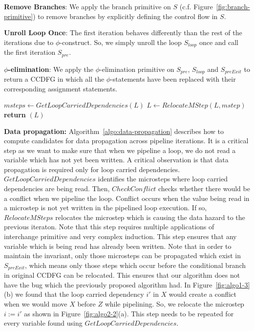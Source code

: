 {\bf Remove Branches}: We apply the branch primitive on $S$ (c.f. Figure~\ref{fig:branch-primitive}) to remove branches by explicitly defining the control flow in $S$. 

{\bf Unroll Loop Once}: The first iteration behaves differently than the rest of the
iterations due to $\phi$-construct. So, we simply unroll the loop $S_{loop}$ once and call the first iteration $S_{pre}$. 

{\bf $\phi$-elimination}: We apply the $\phi$-elimination primitive on $S_{pre}$, $S_{loop}$ and $S_{preExit}$ to return a CCDFG in which all the $\phi$-statements have been replaced with their corresponding assignment statements. 

\begin{algorithm}
\caption{Data propagation} 
\label{algo:data-propagation}
\begin{algorithmic}[1]
\State $msteps \leftarrow GetLoopCarriedDependencies(L)$
\State $L \leftarrow RelocateMStep (L, mstep)$
\EndIf
\EndFor
\State \textbf{return} $(L)$
\EndProcedure
\end{algorithmic}
\end{algorithm}

{\bf Data propagation:} Algorithm~\ref{algo:data-propagation} describes how to compute candidates for data
propagation across pipeline iterations. It is a critical step as we want to make sure that when we pipeline a loop, we do not read a variable which has not
yet been written. A critical observation is that data propagation is required only for loop carried dependencies.
$GetLoopCarriedDependencies$ identifies the microsteps where loop carried dependencies are being read. Then,
$CheckConflict$ checks whether there would be a conflict when we pipeline the loop. Conflict occurs when the value being read in a microstep is not yet written in the pipelined loop execution. If so, $RelocateMSteps$ relocates the microstep which is causing the data hazard to the previous iteraton. Note that this step requires multiple applications of interchange primitive and very complex induction. This step ensures that any variable which is being read has already been written. Note that in order to maintain the invariant, only those microsteps can be propagated which exist in $S_{preExit}$, which means only those steps which occur before the conditional branch in original CCDFG can be relocated. This ensures that our algorithm does not have the bug which the previously proposed algorithm had. In Figure~\ref{fig:algo1-3}(b) we found that the loop carried dependency $i'$ in $X$ would create a conflict when we would move $X$ before $Z$ while pipelining. So, we relocate the microstep $i := i'$ as shown in Figure~\ref{fig:algo2-2}(a). This step needs to be repeated for every variable found using $GetLoopCarriedDependencies$.

